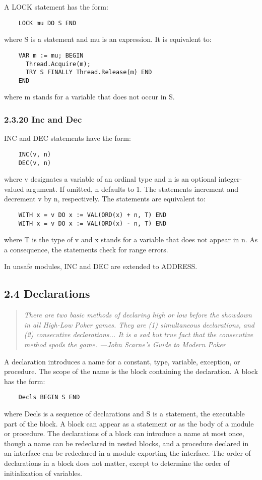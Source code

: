 \documentclass[10pt]{article}
\begin{document}
A LOCK statement has the form:
\begin{verbatim}
    LOCK mu DO S END
\end{verbatim}
where S is a statement and mu is an expression.  It is equivalent to:
\begin{verbatim}
    VAR m := mu; BEGIN
      Thread.Acquire(m);
      TRY S FINALLY Thread.Release(m) END
    END
\end{verbatim}
where m stands for a variable that does not occur in S.

\subsubsection*{2.3.20 Inc and Dec}

INC and DEC statements have the form:
\begin{verbatim}
    INC(v, n)
    DEC(v, n)
\end{verbatim}
where v designates a variable of an ordinal type and n is an optional
integer-valued argument.  If omitted, n defaults to 1.  The statements
increment and decrement v by n, respectively.  The statements are equivalent
to:
\begin{verbatim}
    WITH x = v DO x := VAL(ORD(x) + n, T) END
    WITH x = v DO x := VAL(ORD(x) - n, T) END
\end{verbatim}
where T is the type of v and x stands for a variable that does not appear in
n.  As a consequence, the statements check for range errors.

In unsafe modules, INC and DEC are extended to ADDRESS.

\subsection*{2.4 Declarations}

\begin{quote}
  \emph{ There are two basic methods of declaring high or low before the
    showdown in all High-Low Poker games.  They are (1) simultaneous
    declarations, and (2) consecutive declarations... It is a sad but true
    fact that the consecutive method spoils the game.  ---John Scarne's Guide
    to Modern Poker }
\end{quote}

A declaration introduces a name for a constant, type, variable, exception, or
procedure.  The scope of the name is the block containing the declaration.  A
block has the form:
\begin{verbatim}
    Decls BEGIN S END
\end{verbatim}
where Decls is a sequence of declarations and S is a statement, the executable
part of the block.  A block can appear as a statement or as the body of a
module or procedure.  The declarations of a block can introduce a name at most
once, though a name can be redeclared in nested blocks, and a procedure
declared in an interface can be redeclared in a module exporting the
interface.  The order of declarations in a block does not matter, except to
determine the order of initialization of variables.
\end{document}
